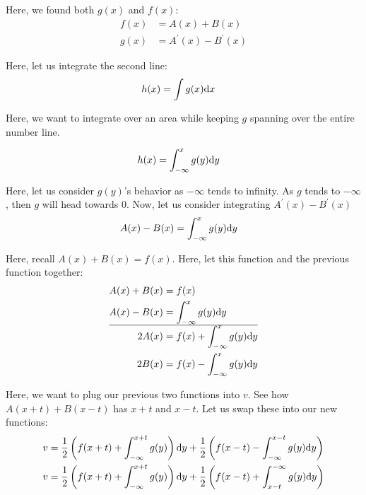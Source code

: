Here, we found both $g(x)$ and $f(x)$:
\begin{align}
  f(x) & = A(x) + B(x)\\
  g(x) & = A^\prime(x) - B^\prime(x)
\end{align}

Here, let us integrate the second line: %
%
\begin{align}
  h(x) & = \int g(x) \text dx
\end{align}

Here, we want to integrate over an area while keeping $g$ spanning over the entire number line.

\begin{align}
  h(x) & = \int^x_{-\infty} g(y) \text dy
\end{align}

Here, let us consider $g(y)$'s behavior as $-\infty$ tends to infinity. As $g$ tends to $-\infty$, then $g$ will head towards $0$. Now, let us consider integrating $A^\prime(x) - B^\prime(x)$
\begin{align}
  A(x) - B(x) & = \int^x_{-\infty} g(y) \text dy
\end{align}

Here, recall $A(x) + B(x) = f(x)$. Here, let this function and the previous function together:
%
\begin{align}
  A(x) + B(x) & = f(x)\\
  A(x) - B(x) & = \int^x_{-\infty} g(y) \text dy\\
  \hline
  2A(x) & = f(x) + \int^x_{-\infty} g(y) \text dy\\
  2B(x) & = f(x) - \int^x_{-\infty} g(y) \text dy
\end{align}

Here, we want to plug our previous two functions into $v$. See how $A(x + t) + B(x - t)$ has $x + t$ and $x - t$. Let us swap these into our new functions:
%
\begin{align}
  v & =
  \frac{1}{2} \left( f(x + t) + \int^{x + t}_{-\infty} g(y) \right) \text dy +
  \frac{1}{2} \left( f(x - t) - \int^{x - t}_{-\infty} g(y) \text dy \right)\\
  v & =
  \frac{1}{2} \left( f(x + t) + \int^{x + t}_{-\infty} g(y) \right) \text dy +
  \frac{1}{2} \left( f(x - t) + \int_{x - t}^{-\infty} g(y) \text dy \right)
\end{align}

